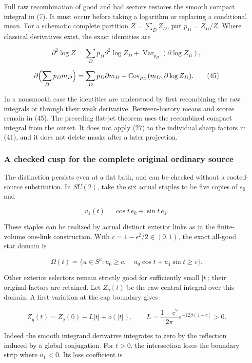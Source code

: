 \documentclass[
  11pt,
]{article}
\begin{document}
Full raw recombination of good and bad sectors restores the smooth
compact integral in (7). It must occur before taking a logarithm or
replacing a conditional mean. For a schematic complete partition
\(Z=\sum_DZ_D\), put \(p_D=Z_D/Z\). Where classical derivatives exist,
the exact identities are

\[
 \partial^2\log Z
 =\sum_Dp_D\partial^2\log Z_D
    +\operatorname{Var}_{p_D}(\partial\log Z_D),
\]

\[
 \partial\Bigl(\sum_Dp_Dm_D\Bigr)
 =\sum_Dp_D\partial m_D
    +\operatorname{Cov}_{p_D}(m_D,\partial\log Z_D). \tag{45}
\]

In a nonsmooth case the identities are understood by first recombining
the raw integrals or through their weak derivative. Between-history
means and scores remain in (45). The preceding flat-jet theorem uses the
recombined compact integral from the outset. It does not apply (27) to
the individual sharp factors in (41), and it does not delete masks after
a later projection.

\hypertarget{a-checked-cusp-for-the-complete-original-ordinary-source}{%
\subsubsection{A checked cusp for the complete original ordinary
source}\label{a-checked-cusp-for-the-complete-original-ordinary-source}}

The distinction persists even at a flat bath, and can be checked without
a rooted-source substitution. In \(SU(2)\), take the six actual staples
to be five copies of \(e_0\) and

\[
 v_1(t)=\cos t\,e_0+\sin t\,e_1.
\]

These staples can be realized by actual distinct exterior links as in
the finite-volume one-link construction. With \(c=1-\epsilon^2/2\in(0,1)\),
the exact all-good star domain is

\[
 \Omega(t)=\{u\in S^3:u_0\ge c,\quad u_0\cos t+u_1\sin t\ge c\}.
\]

Other exterior selectors remain strictly good for sufficiently small
\(|t|\); their original factors are retained. Let \(Z_g(t)\) be the raw
central integral over this domain. A first variation at the cap boundary
gives

\[
 Z_g(t)=Z_g(0)-L|t|+o(|t|),
 \qquad L=\frac{1-c^2}{2\pi}e^{-12\beta(1-c)}>0.    \tag{46}
\]

Indeed the smooth integrand derivative integrates to zero by the
reflection induced by a global conjugation. For \(t>0\), the
intersection loses the boundary strip where \(u_1<0\). Its loss
coefficient is
\end{document}
